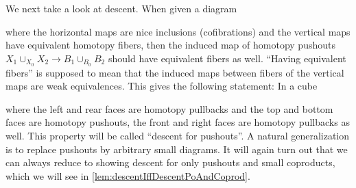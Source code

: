 We next take a look at descent.
When given a diagram 
\begin{center}
\end{center}
where the horizontal maps are nice inclusions (cofibrations) and the vertical maps have equivalent homotopy fibers, then the induced map of homotopy pushouts $X_1\cup_{X_{0}}X_2\to B_1\cup_{B_{0}}B_2$ should have equivalent fibers as well.
``Having equivalent fibers'' is supposed to mean that the induced maps between fibers of the vertical maps are weak equivalences.
This gives the following statement:
In a cube 
\begin{center}
\end{center}
where the left and rear faces are homotopy pullbacks and the top and bottom faces are homotopy pushouts, the front and right faces are homotopy pullbacks as well.
This property will be called ``descent for pushouts''.
A natural generalization is to replace pushouts by arbitrary small diagrams.
It will again turn out that we can always reduce to showing descent for only pushouts and small coproducts, which we will see in \cref{lem:descentIffDescentPoAndCoprod}.